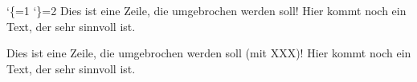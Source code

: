 %
%
%
\catcode`\{=1 %
\catcode`\}=2 %
%
%
\hsize=2in
Dies ist eine Zeile, die umgebrochen werden soll! Hier kommt noch ein Text, der sehr sinnvoll ist.

Dies ist eine Zeile, die umgebrochen werden soll (mit XXX)! Hier kommt noch ein Text, der sehr sinnvoll ist.

